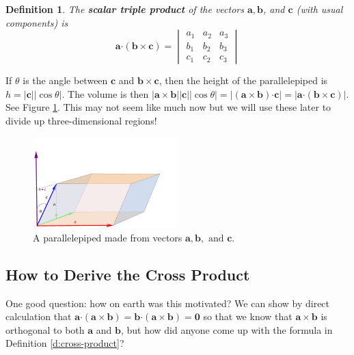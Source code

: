 \documentclass[letterpaper, 11pt, openany]{book}
\newcommand{\scdot}{\boldsymbol{\cdot}}
\theoremstyle{mytheoremstyle}
\newtheorem{definition}{Definition}[section]
\theoremstyle{myexamplestyle}
\begin{document}
\begin{definition}\label{d:scalar-triple-product}
    The \textbf{scalar triple product} of the vectors \(\mathbf{a}, \mathbf{b}\), and \(\mathbf{c}\) (with usual components) is
    \[\mathbf{a} \scdot (\mathbf{b} \times \mathbf{c}) = \begin{vmatrix}
        a_1 & a_2 & a_3 \\ b_1 & b_2 & b_3 \\ c_1 & c_2 & c_3
    \end{vmatrix}\]
\end{definition}
If \(\theta\) is the angle between \(\mathbf{c}\) and \(\mathbf{b} \times \mathbf{c}\), then the height of the parallelepiped is \(h=|\mathbf{c}||\cos \theta|\). The volume is then \(|\mathbf{a} \times \mathbf{b}||\mathbf{c}||\cos \theta| = |(\mathbf{a} \times \mathbf{b})\scdot \mathbf{c}|=|\mathbf{a} \scdot (\mathbf{b} \times \mathbf{c})|\). See Figure \ref{f:parallelepiped}. This may not seem like much now but we will use these later to divide up three-dimensional regions!

\begin{figure}[htbp]
    \centering
        \includegraphics[width=0.5\textwidth]{Figures/parallelepiped.pdf}
    \caption{A parallelepiped made from vectors \(\mathbf{a},\mathbf{b}, \text{ and } \mathbf{c}\).}
    \label{f:parallelepiped}
\end{figure}

\subsection{How to Derive the Cross Product}
One good question: how on earth was this motivated? We can show by direct calculation that \(\mathbf{a}\scdot (\mathbf{a} \times \mathbf{b}) = \mathbf{b} \scdot (\mathbf{a} \times \mathbf{b}) = \mathbf{0}\) so that we know that \(\mathbf{a} \times \mathbf{b}\) is orthogonal to both \(\mathbf{a}\) and \(\mathbf{b}\), but how did anyone come up with the formula in Definition \ref{d:cross-product}?
\end{document}
